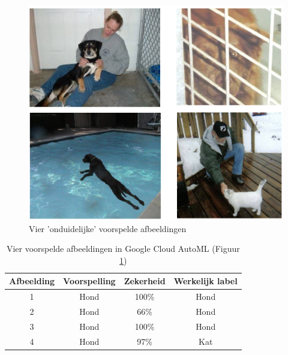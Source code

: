 \begin{figure}
    \centering
    \includegraphics[width=\linewidth]{img/google-automl-pred.png}
    \caption{Vier 'onduidelijke' voorspelde afbeeldingen}
    \label{fig:google-predictions}
\end{figure}

\begin{table}[ht]
    \centering
    \begin{tabular}{c c c c} %
        \hline\hline %
        Afbeelding & Voorspelling & Zekerheid & Werkelijk label \\ [0.5ex] %
        \hline %
        1   &  Hond  & 100\%   & Hond \\ 
        \hline %
        2   &  Hond  & 66\%   & Hond \\ 
        \hline
        3   &  Hond  & 100\%   & Hond \\ 
        \hline
        4   &  Hond  & 97\%   & Kat \\ 
        \hline
    \end{tabular}
    \caption{Vier voorspelde afbeeldingen in Google Cloud AutoML (Figuur \ref{fig:google-predictions})}
    \label{table:google-predicted-images}
\end{table}

